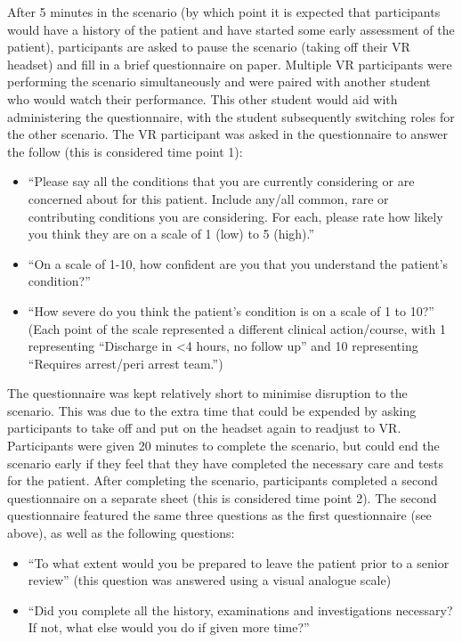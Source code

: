 \documentclass[a4paper, nobind]{templates/ociamthesis}
\providecommand{\tightlist}{%
  \setlength{\itemsep}{0pt}\setlength{\parskip}{0pt}}
\begin{document}
After 5 minutes in the scenario (by which point it is expected that participants would have a history of the patient and have started some early assessment of the patient), participants are asked to pause the scenario (taking off their VR headset) and fill in a brief questionnaire on paper. Multiple VR participants were performing the scenario simultaneously and were paired with another student who would watch their performance. This other student would aid with administering the questionnaire, with the student subsequently switching roles for the other scenario. The VR participant was asked in the questionnaire to answer the follow (this is considered time point 1):

\begin{itemize}
\tightlist
\item
  ``Please say all the conditions that you are currently considering or are concerned about for this patient. Include any/all common, rare or contributing conditions you are considering. For each, please rate how likely you think they are on a scale of 1 (low) to 5 (high).''
\item
  ``On a scale of 1-10, how confident are you that you understand the patient's condition?''
\item
  ``How severe do you think the patient's condition is on a scale of 1 to 10?'' (Each point of the scale represented a different clinical action/course, with 1 representing ``Discharge in \textless4 hours, no follow up'' and 10 representing ``Requires arrest/peri arrest team.'')
\end{itemize}

The questionnaire was kept relatively short to minimise disruption to the scenario. This was due to the extra time that could be expended by asking participants to take off and put on the headset again to readjust to VR. Participants were given 20 minutes to complete the scenario, but could end the scenario early if they feel that they have completed the necessary care and tests for the patient. After completing the scenario, participants completed a second questionnaire on a separate sheet (this is considered time point 2). The second questionnaire featured the same three questions as the first questionnaire (see above), as well as the following questions:

\begin{itemize}
\tightlist
\item
  ``To what extent would you be prepared to leave the patient prior to a senior review'' (this question was answered using a visual analogue scale)
\item
  ``Did you complete all the history, examinations and investigations necessary? If not, what else would you do if given more time?''
\end{itemize}
\end{document}
